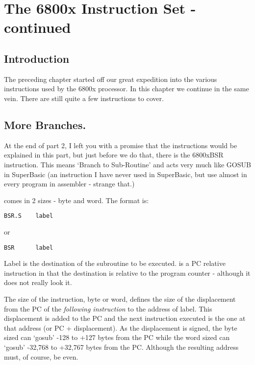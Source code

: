 \chapter{The 6800x Instruction Set -{} continued}

\section{Introduction}
\label{ch3-intro}%

The preceding chapter started off our great expedition into the
    various instructions used by the 6800x processor. In this chapter we
    continue in the same vein. There are still quite a few instructions to
    cover.

\section{More Branches.}
\label{ch3-more-branches}%

At the end of part 2, I left you with a promise that the 
    instructions would be explained in this part, but just before we do that,
    there is the \mc6800x{BSR} instruction. This means `Branch to Sub-{}Routine' and acts
    very much like GOSUB in SuperBasic (an instruction I have never used in
    SuperBasic, but use almost in every program in assembler -{} strange
    that.)

 comes in 2 sizes -{} byte and word. The format is:

\begin{lstlisting}[firstnumber=1,]
          BSR.S    label
\end{lstlisting}

or

\begin{lstlisting}[firstnumber=1,]
          BSR      label
\end{lstlisting}

Label is the destination of the subroutine to be executed.  is a
    PC relative instruction in that the destination is relative to the program
    counter -{} although it does not really look it.

The size of the instruction, byte or word, defines the size of the displacement from
the PC of the \emph{following instruction} to the address of label. This
displacement is added to the PC and the next instruction executed is the one at that
address (or PC + displacement). As the displacement is signed, the byte sized  can
`gosub' -{}128 to +127 bytes from the PC while the word sized  can `gosub' -{}32,768 to
+32,767 bytes from the PC. Although the resulting address must, of course, be even.

